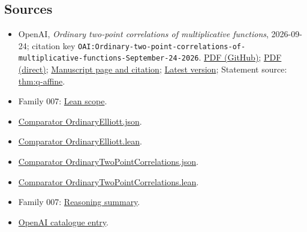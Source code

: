 \documentclass[11pt]{article}
\begin{document}
\subsection{Sources}
\begin{itemize}
\item OpenAI, \emph{Ordinary two-point correlations of multiplicative functions}, 2026-09-24; citation key \texttt{OAI:Ordinary-two-point-correlations-of-multiplicative-functions-September-24-2026}. \href{https://github.com/openai/math/blob/adc7f1241b42e322a6451854ab7e4b4c146bf78a/preprints/Ordinary-two-point-correlations-of-multiplicative-functions-September-24-2026/final.pdf}{PDF (GitHub)}; \href{https://github.com/openai/math/raw/adc7f1241b42e322a6451854ab7e4b4c146bf78a/preprints/Ordinary-two-point-correlations-of-multiplicative-functions-September-24-2026/final.pdf}{PDF (direct)}; \href{https://github.com/openai/math/blob/adc7f1241b42e322a6451854ab7e4b4c146bf78a/preprints/Ordinary-two-point-correlations-of-multiplicative-functions-September-24-2026/README.md}{Manuscript page and citation}; \href{https://github.com/openai/math/blob/main/preprints/Ordinary-two-point-correlations-of-multiplicative-functions-September-24-2026/final.pdf}{Latest version}; Statement source: \href{https://github.com/openai/math/blob/adc7f1241b42e322a6451854ab7e4b4c146bf78a/preprints/Ordinary-two-point-correlations-of-multiplicative-functions-September-24-2026/build/introduction.tex\#L20}{thm:q-affine}.
\item Family 007: \href{https://github.com/openai/math/blob/adc7f1241b42e322a6451854ab7e4b4c146bf78a/lean/docs/007.md}{Lean scope}.
\item \href{https://github.com/openai/math/blob/adc7f1241b42e322a6451854ab7e4b4c146bf78a/lean/ComparatorChallenges/OrdinaryElliott.json}{Comparator OrdinaryElliott.json}.
\item \href{https://github.com/openai/math/blob/adc7f1241b42e322a6451854ab7e4b4c146bf78a/lean/ComparatorChallenges/OrdinaryElliott.lean}{Comparator OrdinaryElliott.lean}.
\item \href{https://github.com/openai/math/blob/adc7f1241b42e322a6451854ab7e4b4c146bf78a/lean/ComparatorChallenges/OrdinaryTwoPointCorrelations.json}{Comparator OrdinaryTwoPointCorrelations.json}.
\item \href{https://github.com/openai/math/blob/adc7f1241b42e322a6451854ab7e4b4c146bf78a/lean/ComparatorChallenges/OrdinaryTwoPointCorrelations.lean}{Comparator OrdinaryTwoPointCorrelations.lean}.
\item Family 007: \href{https://github.com/openai/math/blob/adc7f1241b42e322a6451854ab7e4b4c146bf78a/reasoning\_traces/ordinary-two-point-correlations.pdf}{Reasoning summary}.
\item \href{https://github.com/openai/math/blob/adc7f1241b42e322a6451854ab7e4b4c146bf78a/CONTENTS.md}{OpenAI catalogue entry}.
\end{itemize}
\end{document}
